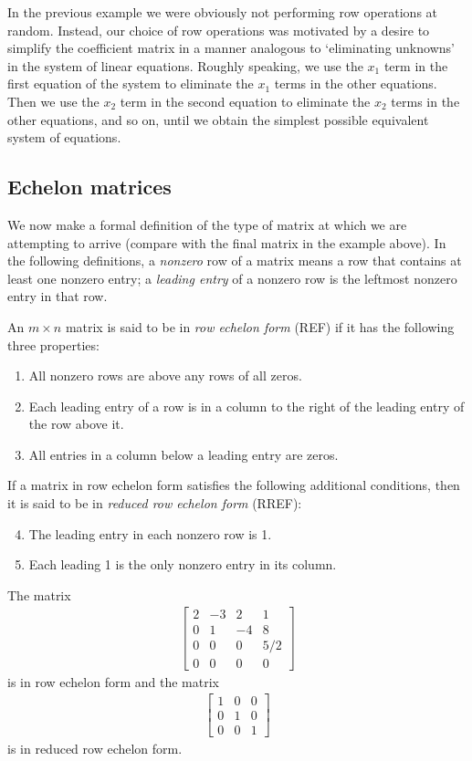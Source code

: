 \documentclass[12pt,letterpaper,reqno]{article}
\numberwithin{equation}{section}
\newcommand{\ti}[1]{\textit{#1}}
\begin{document}
In the previous example we were obviously not performing row operations at random. Instead, our choice of row operations was motivated by a desire to simplify the coefficient matrix in a manner analogous to `eliminating unknowns' in the system of linear equations. Roughly speaking, we use the $x_1$ term in the first equation of the system to eliminate the $x_1$ terms in the other equations. Then we use the $x_2$ term in the second equation to eliminate the $x_2$ terms in the other equations, and so on, until we obtain the simplest possible equivalent system of equations. 

\subsection{Echelon matrices}
We now make a formal definition of the type of matrix at which we are attempting to arrive (compare with the final matrix in the example above). In the following definitions, a \ti{nonzero} row of a matrix means a row that contains at least one nonzero entry; a \ti{leading entry} of a nonzero row is the leftmost nonzero entry in that row.
\begin{defn}
	An $m \times n$ matrix is said to be in \ti{row echelon form} (REF) if it has the following three properties:
	\begin{enumerate}
		\item All nonzero rows are above any rows of all zeros.
		\item Each leading entry of a row is in a column to the right of the leading entry of the row above it.
		\item All entries in a column below a leading entry are zeros.
	\end{enumerate}
If a matrix in row echelon form satisfies the following additional conditions, then it is said to be in \ti{reduced row echelon form} (RREF):
\begin{enumerate}
\setcounter{enumi}{3}
	\item The leading entry in each nonzero row is 1.
	\item Each leading 1 is the only nonzero entry in its column.
\end{enumerate}
\end{defn}

\begin{example}
The matrix
\begin{align*}
	\begin{bmatrix}
	2&-3&2&1 \\
	0&1&-4&8 \\
	0&0&0&5/2 \\
	0&0&0&0
\end{bmatrix}
\end{align*}
is in row echelon form and the matrix 
\begin{align*}
	\begin{bmatrix}
	1&0&0 \\ 0 & 1 & 0 \\ 0&0&1
\end{bmatrix}
\end{align*}
is in reduced row echelon form.	
\end{example}
\end{document}
